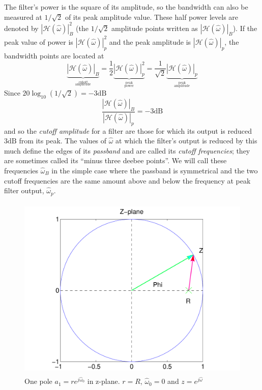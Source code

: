 The filter's power is the square of its amplitude, so the bandwidth
can also be measured at $1/\sqrt{2}$ of its peak amplitude value.
These half power levels are denoted by
$|\mathcal{H}(\hat{\omega})|_B^2$ (the $1/\sqrt{2}$ amplitude points
written as $|\mathcal{H}(\hat{\omega})|_B$). If the peak value of
power is $|\mathcal{H}(\hat{\omega})|_p^2$ and the peak amplitude is
$|\mathcal{H}(\hat{\omega})|_p$, the bandwidth points are located at
\begin{equation}
\underbrace{|\mathcal{H}(\hat{\omega})|_B}_{\stackrel{\text{cutoff}}{_\text{amplitude}}}
  = \frac{1}{2}\underbrace{|\mathcal{H}(\hat{\omega})|_p^2}_{\stackrel{\text{peak}}{_\text{power}}}
  = \frac{1}{\sqrt{2}}\underbrace{|\mathcal{H}(\hat{\omega})|_p}_{\stackrel{\text{peak}}{_\text{amplitude}}}
\label{eq:fb-band}
\end{equation}
Since $20\log_{10}(1/\sqrt{2})=-3\mathrm{dB}$
\begin{equation}
\frac{|\mathcal{H}(\hat{\omega})|_B}{|\mathcal{H}(\hat{\omega})|_p} 
  = -3\mathrm{dB}
\end{equation}
and so the \emph{cutoff amplitude} for a filter are those for which
its output is reduced $3\mathrm{dB}$ from its peak.
The values of $\hat{\omega}$ at which the filter's output is reduced
by this much define the edges of its \emph{passband} and are called
its \emph{cutoff frequencies}; they are sometimes called
its ``minus three deebee points''.
We will call these frequencies $\hat{\omega}_B$ in the simple case
where the passband is symmetrical and the two cutoff frequencies are
the same amount above and below the frequency at peak filter output,
$\hat{\omega}_p$.

\begin{figure}
\centerline{\includegraphics[height=3.5in]{ch-iir/fbexp_1p_c0_phi}}
\caption{One pole $a_1=re^{j\hat{\omega}_0}$ in z-plane. $r=R$,
$\hat{\omega}_0=0$ and $z=e^{j\hat{\omega}}$
\label{fig:fb-exp1pc0_phi}}
\end{figure}


